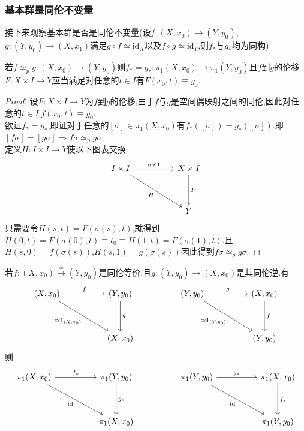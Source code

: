 \documentclass{article}
\begin{document}
\subsubsection{基本群是同伦不变量}
接下来观察基本群是否是同伦不变量(设$f : (X,x_0) \to (Y,y_0)$,$g: (Y,y_0) \to (X,x_1)$满足$g \circ f \simeq \text{id}_X$以及$f \circ g \simeq \text{id}_Y$,则$f_*$与$g_*$均为同构)
\begin{lemma}
    若$f \simeq_p g : (X,x_0) \to (Y,y_0)$则$f_* = g_*: \pi_1(X,x_0) \to \pi_1(Y,y_0)$且$f$到$g$的伦移$F : X \times I \to Y$应当满足对任意的$t \in I$有$F(x_0,t) \equiv y_0$.
\end{lemma}
\begin{proof}
    设$F :X \times I \to Y$为$f$到$g$的伦移,由于$f$与$g$是空间偶映射之间的同伦,因此对任意的$t \in I$,$f(x_0,t) \equiv y_0$.\\
    欲证$f_* = g_*$,即证对于任意的$[\sigma]\in \pi_1(X,x_0)$有$f_*([\sigma]) = g_*([\sigma])$.即$[f\sigma] = [g \sigma]\Rightarrow f \sigma \simeq_p g \sigma$.\\
    定义$H : I \times I \to Y$使以下图表交换
    \[\begin{tikzcd}
        {I \times I} && {X \times I} \\
        \\
        && Y
        \arrow["F", from=1-3, to=3-3]
        \arrow["{\sigma \times 1}", from=1-1, to=1-3]
        \arrow["H"', from=1-1, to=3-3]
    \end{tikzcd}\]
    只需要令$H(s,t) = F(\sigma(s),t)$,就得到$H(0,t) = F(\sigma(0) ,t) \equiv t_0 \equiv H(1,t) = F(\sigma(1),t)$.且$H(s,0) = f(\sigma(s))$,$H(s,1) = g(\sigma(s))$因此得到$f\sigma \simeq_p g \sigma$.
\end{proof}
\begin{corollary}
    若$f : (X,x_0)\xrightarrow{\simeq} (Y,y_0)$是同伦等价,且$g : (Y,y_0) \to (X,x_0)$是其同伦逆.有\\
    \[\begin{tikzcd}
        {(X,x_0)} && {(Y,y_0)} && {(Y,y_0)} && {(X,x_0)} \\
        \\
        && {(X,x_0)} &&&& {(Y,y_0)}
        \arrow["g", from=1-5, to=1-7]
        \arrow["f", from=1-7, to=3-7]
        \arrow["{\simeq 1_{(Y,y_0)}}"', from=1-5, to=3-7]
        \arrow["f", from=1-1, to=1-3]
        \arrow["{\simeq 1_{(X,x_0)}}"', from=1-1, to=3-3]
        \arrow["g", from=1-3, to=3-3]
    \end{tikzcd}\]
    则
    \[\begin{tikzcd}
        {\pi_1(X,x_0)} && {\pi_1(Y,y_0)} && {\pi_1(Y,y_0)} && {\pi_1(X,x_0)} \\
        \\
        && {\pi_1(X,x_0)} &&&& {\pi_1(Y,y_0)}
        \arrow["{g_*}", from=1-5, to=1-7]
        \arrow["{f_*}", from=1-7, to=3-7]
        \arrow["{\text{id}}"', from=1-5, to=3-7]
        \arrow["{f_*}", from=1-1, to=1-3]
        \arrow["{\text{id}}"', from=1-1, to=3-3]
        \arrow["{g_*}", from=1-3, to=3-3]
    \end{tikzcd}\]
\end{corollary}
\end{document}
